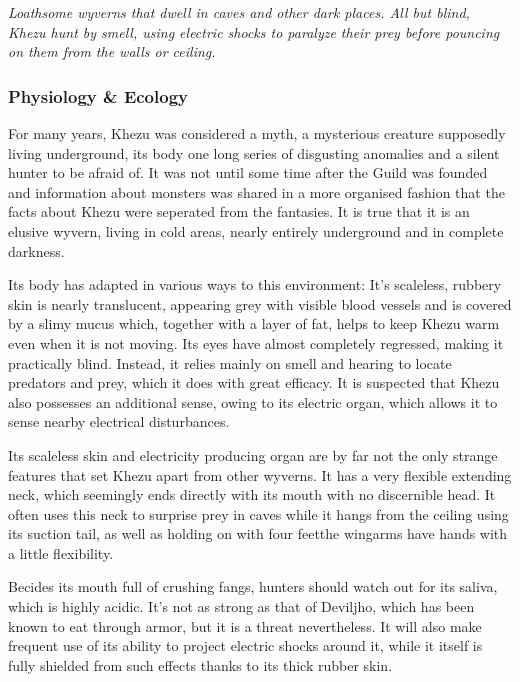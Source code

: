 \textit{Loathsome wyverns that dwell in caves and other dark places. All but blind, Khezu hunt by smell, using electric shocks to paralyze their prey before pouncing on them from the walls or ceiling.}%
\subsubsection{Physiology \& Ecology}
For many years, Khezu was considered a myth, a mysterious creature supposedly living underground, its body one long series of disgusting anomalies and a silent hunter to be afraid of. It was not until some time after the Guild was founded and information about monsters was shared in a more organised fashion that the facts about Khezu were seperated from the fantasies. It is true that it is an elusive wyvern, living in cold areas, nearly entirely underground and in complete darkness.

Its body has adapted in various ways to this environment: It's scaleless, rubbery skin is nearly translucent, appearing grey with visible blood vessels and is covered by a slimy mucus which, together with a layer of fat, helps to keep Khezu warm even when it is not moving. Its eyes have almost completely regressed, making it practically blind. Instead, it relies mainly on smell and hearing to locate predators and prey, which it does with great efficacy. It is suspected that Khezu also possesses an additional sense, owing to its electric organ, which allows it to sense nearby electrical disturbances.

Its scaleless skin and electricity producing organ are by far not the only strange features that set Khezu apart from other wyverns. It has a very flexible extending neck, which seemingly ends directly with its mouth with no discernible head. It often uses this neck to surprise prey in caves while it hangs from the ceiling using its suction tail, as well as holding on with four feet\hbNone the wingarms have hands with a little flexibility.

Becides its mouth full of crushing fangs, hunters should watch out for its saliva, which is highly acidic. It's not as strong as that of Deviljho, which has been known to eat through armor, but it is a threat nevertheless. It will also make frequent use of its ability to project electric shocks around it, while it itself is fully shielded from such effects thanks to its thick rubber skin.

